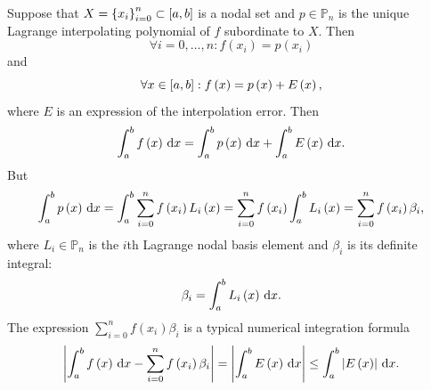 \begin{frame}
    Suppose that
    \begin{math}
        X={\left\{x_{i}\right\}}_{i=0}^{n}\subset
        \left[a,b\right]
    \end{math}
    is a nodal set and $p\in\mathbb{P}_{n}$ is the unique Lagrange
    interpolating polynomial of $f$ subordinate to $X$.
    Then
    \begin{equation*}
        \forall i=0,\dotsc,n:
        f\left(x_{i}\right)=
        p\left(x_{i}\right)
    \end{equation*}
    and
    \begin{equation*}
        \forall x\in
        \left[a,b\right]:
        f\left(x\right)=
        p\left(x\right)+
        E\left(x\right),
    \end{equation*}
    where $E$ is an expression of the interpolation error.
    Then
    \begin{equation*}
        \int_{a}^{b}
        f\left(x\right)
        \dl x=
        \int_{a}^{b}
        p\left(x\right)
        \dl x+
        \int_{a}^{b}
        E\left(x\right)
        \dl x.
    \end{equation*}
    But
    \begin{equation*}
        \int_{a}^{b}
        p\left(x\right)
        \dl x=
        \int_{a}^{b}
        \sum_{i=0}^{n}
        f\left(x_{i}\right)
        L_{i}\left(x\right)=
        \sum_{i=0}^{n}
        f\left(x_{i}\right)
        \int_{a}^{b}
        L_{i}\left(x\right)=
        \sum_{i=0}^{n}
        f\left(x_{i}\right)
        \beta_{i},
    \end{equation*}
    where $L_{i}\in\mathbb{P}_{n}$ is the $i$th Lagrange nodal basis
    element and $\beta_{i}$ is its definite integral:
    \begin{equation*}
        \beta_{i}=
        \int_{a}^{b}
        L_{i}\left(x\right)
        \dl x.
    \end{equation*}
    The expression
    \begin{math}
        \sum_{i=0}^{n}
        f\left(x_{i}\right)
        \beta_{i}
    \end{math}
    is a typical numerical integration formula
    \begin{equation*}
        \left|
        \int_{a}^{b}
        f\left(x\right)
        \dl x-
        \sum_{i=0}^{n}
        f\left(x_{i}\right)
        \beta_{i}
        \right|=
        \left|
        \int_{a}^{b}
        E\left(x\right)
        \dl x
        \right|\leq
        \int_{a}^{b}
        \left|
        E\left(x\right)
        \right|
        \dl x.
    \end{equation*}
\end{frame}

